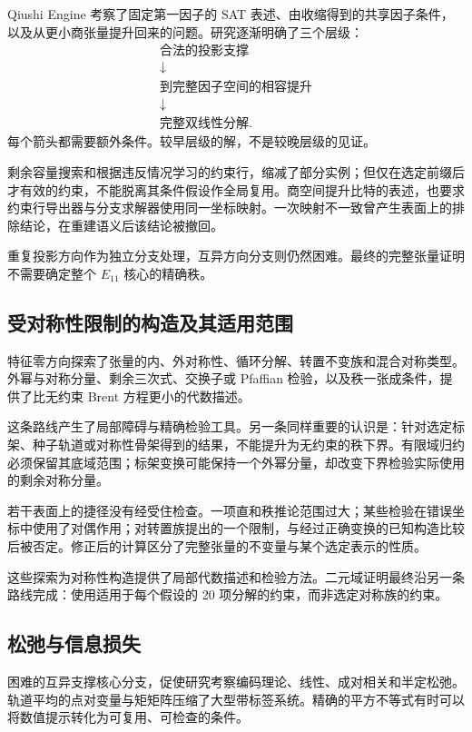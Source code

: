 Qiushi Engine 考察了固定第一因子的 SAT 表述、由收缩得到的共享因子条件，以及从更小商张量提升回来的问题。研究逐渐明确了三个层级：
\[
 \begin{gathered}
 \text{合法的投影支撑}\\
 \downarrow\\
 \text{到完整因子空间的相容提升}\\
 \downarrow\\
 \text{完整双线性分解}.
 \end{gathered}
\]
每个箭头都需要额外条件。较早层级的解，不是较晚层级的见证。

剩余容量搜索和根据违反情况学习的约束行，缩减了部分实例；但仅在选定前缀后才有效的约束，不能脱离其条件假设作全局复用。商空间提升比特的表述，也要求约束行导出器与分支求解器使用同一坐标映射。一次映射不一致曾产生表面上的排除结论，在重建语义后该结论被撤回。

重复投影方向作为独立分支处理，互异方向分支则仍然困难。最终的完整张量证明不需要确定整个 $E_{11}$ 核心的精确秩。

\subsection{受对称性限制的构造及其适用范围}\label{route:symmetry}

特征零方向探索了张量的内、外对称性、循环分解、转置不变族和混合对称类型。外幂与对称分量、剩余三次式、交换子或 Pfaffian 检验，以及秩一张成条件，提供了比无约束 Brent 方程更小的代数描述。

这条路线产生了局部障碍与精确检验工具。另一条同样重要的认识是：针对选定标架、种子轨道或对称性骨架得到的结果，不能提升为无约束的秩下界。有限域归约必须保留其底域范围；标架变换可能保持一个外幂分量，却改变下界检验实际使用的剩余对称分量。

若干表面上的捷径没有经受住检查。一项直和秩推论范围过大；某些检验在错误坐标中使用了对偶作用；对转置族提出的一个限制，与经过正确变换的已知构造比较后被否定。修正后的计算区分了完整张量的不变量与某个选定表示的性质。

这些探索为对称性构造提供了局部代数描述和检验方法。二元域证明最终沿另一条路线完成：使用适用于每个假设的 20 项分解的约束，而非选定对称族的约束。

\subsection{松弛与信息损失}\label{route:relaxation}

困难的互异支撑核心分支，促使研究考察编码理论、线性、成对相关和半定松弛。轨道平均的点对变量与矩矩阵压缩了大型带标签系统。精确的平方不等式有时可以将数值提示转化为可复用、可检查的条件。

